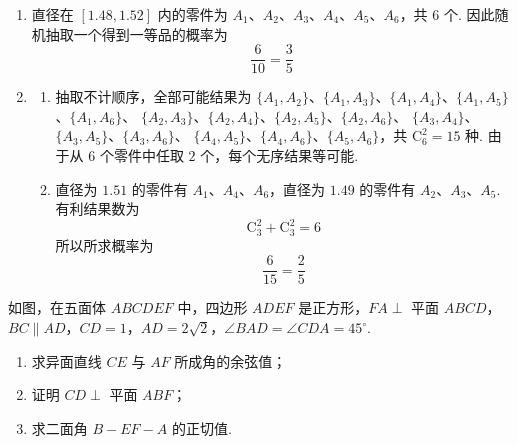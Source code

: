 \begin{solution}
\begin{enumerate}
\item 直径在 \([1.48,1.52]\) 内的零件为
\(A_1\)、\(A_2\)、\(A_3\)、\(A_4\)、\(A_5\)、\(A_6\)，共 \(6\) 个. 因此随机抽取一个得到一等品的概率为
\[
\frac{6}{10}=\frac35
\]
\item
\begin{enumerate}
\item 抽取不计顺序，全部可能结果为
\(\{A_1,A_2\}\)、\(\{A_1,A_3\}\)、\(\{A_1,A_4\}\)、\(\{A_1,A_5\}\)、\(\{A_1,A_6\}\)、
\(\{A_2,A_3\}\)、\(\{A_2,A_4\}\)、\(\{A_2,A_5\}\)、\(\{A_2,A_6\}\)、
\(\{A_3,A_4\}\)、\(\{A_3,A_5\}\)、\(\{A_3,A_6\}\)、
\(\{A_4,A_5\}\)、\(\{A_4,A_6\}\)、\(\{A_5,A_6\}\)，共
\(\mathrm C_6^2=15\) 种. 由于从 \(6\) 个零件中任取 \(2\) 个，每个无序结果等可能.
\item 直径为 \(1.51\) 的零件有 \(A_1\)、\(A_4\)、\(A_6\)，直径为 \(1.49\) 的零件有 \(A_2\)、\(A_3\)、\(A_5\). 有利结果数为
\[
\mathrm C_3^2+\mathrm C_3^2=6
\]
所以所求概率为
\[
\frac{6}{15}=\frac25
\]
\end{enumerate}
\end{enumerate}
\end{solution}

\begin{problem}
如图，在五面体 \(ABCDEF\) 中，四边形 \(ADEF\) 是正方形，\(FA \perp\) 平面 \(ABCD\)，\(BC \parallel AD\)，\(CD = 1\)，\(AD = 2\sqrt{2}\)，\(\angle BAD = \angle CDA = 45^\circ\).

\begin{enumerate}
\item 求异面直线 \(CE\) 与 \(AF\) 所成角的余弦值；
\item 证明 \(CD \perp\) 平面 \(ABF\)；
\item 求二面角 \(B - EF - A\) 的正切值.
\end{enumerate}

\end{problem}

